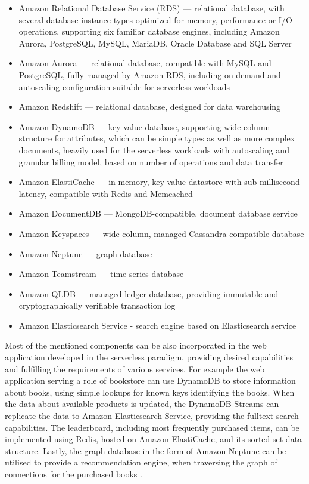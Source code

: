 \begin{itemize}
   \item Amazon Relational Database Service (RDS) --- relational database, with several database instance types optimized for memory, performance or I/O operations, supporting six familiar database engines, including Amazon Aurora, PostgreSQL, MySQL, MariaDB, Oracle Database and SQL Server
   \item Amazon Aurora --- relational database, compatible with MySQL and PostgreSQL, fully managed by Amazon RDS, including on-demand and autoscaling configuration suitable for serverless workloads
   \item Amazon Redshift --- relational database, designed for data warehousing
   \item Amazon DynamoDB --- key-value database, supporting wide column structure for attributes, which can be simple types as well as more complex documents, heavily used for the serverless workloads with autoscaling and granular billing model, based on number of operations and data transfer
   \item Amazon ElastiCache --- in-memory, key-value datastore with sub-millisecond latency, compatible with Redis and Memcached
   \item Amazon DocumentDB --- MongoDB-compatible, document database service
   \item Amazon Keyspaces --- wide-column, managed Cassandra-compatible database
   \item Amazon Neptune --- graph database
   \item Amazon Teamstream --- time series database
   \item Amazon QLDB --- managed ledger database, providing immutable and cryptographically verifiable transaction log
   \item Amazon Elasticsearch Service - search engine based on Elasticsearch service
\end{itemize}

Most of the mentioned components can be also incorporated in the web application developed in the serverless paradigm, providing desired capabilities and fulfilling the requirements of various services.
For example the web application serving a role of bookstore can use DynamoDB to store information about books, using simple lookups for known keys identifying the books.
When the data about available products is updated, the DynamoDB Streams can replicate the data to Amazon Elasticsearch Service, providing the fulltext search capabilities.
The leaderboard, including most frequently purchased items, can be implemented using Redis, hosted on Amazon ElastiCache, and its sorted set data structure.
Lastly, the graph database in the form of Amazon Neptune can be utilised to provide a recommendation engine, when traversing the graph of connections for the purchased books \cite{DatabasesOnAWSTheRightToolForTheRightJob}.

